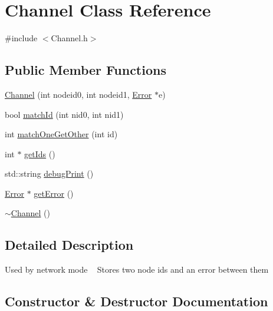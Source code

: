 \hypertarget{class_channel}{}\section{Channel Class Reference}
\label{class_channel}


{\ttfamily \#include $<$Channel.\+h$>$}

\subsection*{Public Member Functions}
\begin{DoxyCompactItemize}
\item 
\hyperlink{class_channel_a5c4f341674fed76b66ae766d268c574a}{Channel} (int nodeid0, int nodeid1, \hyperlink{class_error}{Error} $\ast$e)
\item 
bool \hyperlink{class_channel_a089e35cdef5be2b10d630c2ef4914dc1}{match\+Id} (int nid0, int nid1)
\item 
int \hyperlink{class_channel_a5b81ce0b217813d9b0ec13d5042d297f}{match\+One\+Get\+Other} (int id)
\item 
int $\ast$ \hyperlink{class_channel_adae91e67fc9e0d22d47606efe7a704ec}{get\+Ids} ()
\item 
std\+::string \hyperlink{class_channel_ac91f51b1333e8b69a936b8cd0d39bb65}{debug\+Print} ()
\item 
\hyperlink{class_error}{Error} $\ast$ \hyperlink{class_channel_a4c99f5f2b94cf100a1f91dd9df7eee81}{get\+Error} ()
\item 
\hyperlink{class_channel_a5f15ebd302464069f1a9e3f0ded14482}{$\sim$\+Channel} ()
\end{DoxyCompactItemize}


\subsection{Detailed Description}
Used by network mode ~\newline
 Stores two node ids and an error between them 

\subsection{Constructor \& Destructor Documentation}
